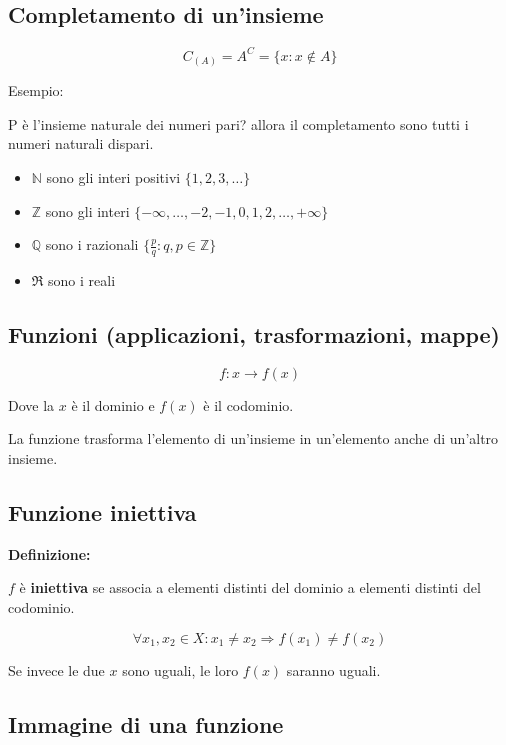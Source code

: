 \documentclass{article}
\begin{document}
\subsection{Completamento di un'insieme}
\begin{equation*}
    C_{(A)} = A^C = \{x : x \notin A\}
\end{equation*}

Esempio:

P è l'insieme naturale dei numeri pari? allora il completamento sono tutti i numeri naturali dispari.


\begin{itemize}
    \item $\mathbb{N}$ sono gli interi positivi $\{1,2,3,\dots\}$
    \item $\mathbb{Z}$ sono gli interi $\{-\infty, \dots, -2, -1, 0, 1, 2, \dots, +\infty\}$
    \item $\mathbb{Q}$ sono i razionali $\{\frac{p}{q} : q,p \in \mathbb{Z}\}$
    \item $\Re$ sono i reali
\end{itemize}

\subsection{Funzioni (applicazioni, trasformazioni, mappe)}
\begin{equation*}
    f: x \rightarrow f(x)
\end{equation*}

Dove la $x$ è il dominio e $f(x)$ è il codominio.

La funzione trasforma l'elemento di un'insieme in un'elemento anche di un'altro insieme.

\subsection{Funzione iniettiva}
\textbf{Definizione:}

$f$ è \textbf{iniettiva} se associa a elementi distinti del dominio a elementi distinti del codominio.

\begin{equation*}
    \forall x_1, x_2 \in X : x_1 \neq x_2 \Rightarrow f(x_1) \neq f(x_2)
\end{equation*}

Se invece le due $x$ sono uguali, le loro $f(x)$ saranno uguali.

\subsection{Immagine di una funzione}
\end{document}
